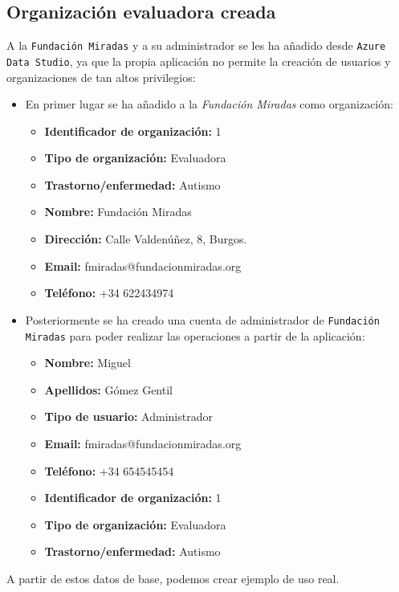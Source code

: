 \subsection{Organización evaluadora creada}
A la \texttt{Fundación Miradas} y a su administrador se les ha añadido desde
\texttt{Azure Data Studio}, ya que la propia aplicación no permite la creación
de usuarios y organizaciones de tan altos privilegios:
\begin{itemize}
    \item En primer lugar se ha añadido a la \textit{Fundación Miradas} como organización:
    \begin{itemize}
        \item \textbf{Identificador de organización: }1
        \item \textbf{Tipo de organización: }Evaluadora
        \item \textbf{Trastorno/enfermedad: }Autismo
        \item \textbf{Nombre: }Fundación Miradas
        \item \textbf{Dirección: }Calle Valdenúñez, 8, Burgos.
        \item \textbf{Email: }fmiradas@fundacionmiradas.org
        \item \textbf{Teléfono: }+34 622434974
    \end{itemize}
    \item Posteriormente se ha creado una cuenta de administrador de
    \texttt{Fundación Miradas} para poder realizar las operaciones a partir de la
    aplicación:
    \begin{itemize}
        \item \textbf{Nombre: }Miguel
        \item \textbf{Apellidos: }Gómez Gentil
        \item \textbf{Tipo de usuario: }Administrador
        \item \textbf{Email: }fmiradas@fundacionmiradas.org
        \item \textbf{Teléfono: }+34 654545454
        \item \textbf{Identificador de organización: }1
        \item \textbf{Tipo de organización: }Evaluadora
        \item \textbf{Trastorno/enfermedad: }Autismo
    \end{itemize}
\end{itemize}
A partir de estos datos de base, podemos crear ejemplo de uso real.

